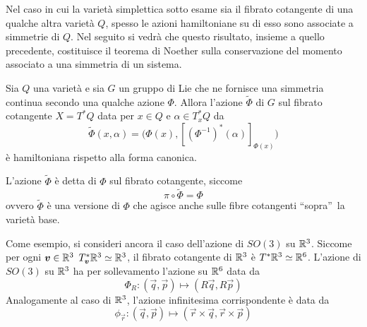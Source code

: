 Nel caso in cui la varietà simplettica sotto esame sia il fibrato cotangente di una qualche altra varietà $Q$, spesso le azioni hamiltoniane su di esso sono associate a simmetrie di $Q$. Nel seguito si vedrà che questo risultato, insieme a quello precedente, costituisce il teorema di Noether sulla conservazione del momento associato a una simmetria di un sistema.
\begin{theorem}
  Sia $Q$ una varietà e sia $G$ un gruppo di Lie che ne fornisce una simmetria continua secondo una qualche azione $\Phi$. Allora l'azione $\tilde{\Phi}$ di $G$ sul fibrato cotangente $X=T^*Q$ data per $x \in Q$ e $\alpha \in T^*_x Q$ da
  \begin{equation*}
  \tilde{\Phi}(x,\alpha) = \big(\Phi(x), [(\Phi^{-1})^*(\alpha)]_{\Phi(x)}\big)
  \end{equation*} 
  è hamiltoniana rispetto alla forma canonica.
\end{theorem}
\begin{remark}
  L'azione $\tilde{\Phi}$ è detta  di $\Phi$ sul fibrato cotangente, siccome \begin{equation*}
  \pi \circ \tilde{\Phi} = \Phi
  \end{equation*}
  ovvero $\tilde{\Phi}$ è una versione di $\Phi$ che agisce anche sulle fibre cotangenti \textquotedblleft sopra\textquotedblright\ la varietà base.
\end{remark}

Come esempio, si consideri ancora il caso dell'azione di $SO(3)$ su $\mathbb{R}^3$. Siccome per ogni $\boldsymbol{v} \in  \mathbb{R}^3$ $T^*_{\boldsymbol{v}}\mathbb{R}^3 \simeq \mathbb{R}^3$, il fibrato cotangente di $\mathbb{R}^3$ è $T^*\mathbb{R}^3 \simeq \mathbb{R}^6$. L'azione di $SO(3)$ su $\mathbb{R}^3$ ha per sollevamento l'azione su $\mathbb{R}^6$ data da 
\begin{equation*}
\Phi_R: (\vec{q},\vec{p}) \mapsto (R\vec{q},R\vec{p})
\end{equation*}  
Analogamente al caso di $\mathbb{R}^3$, l'azione infinitesima corrispondente è data da
\begin{equation*}
\phi_{\vec{r}}: (\vec{q},\vec{p}) \mapsto (\vec{r}\times \vec{q},\vec{r}\times \vec{p})
\end{equation*}

